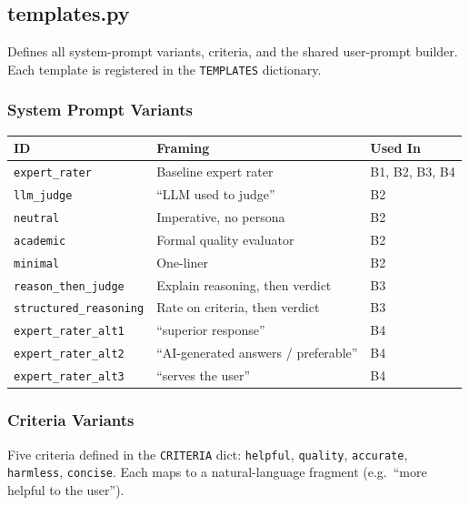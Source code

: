 \documentclass[11pt,a4paper]{article}
\begin{document}
\subsection{templates.py}

\begin{modulebox}
Defines all system-prompt variants, criteria, and the shared user-prompt
builder. Each template is registered in the \texttt{TEMPLATES} dictionary.
\end{modulebox}

\subsubsection*{System Prompt Variants}

\begin{center}
\small
\begin{tabular}{lll}
  \toprule
  \textbf{ID} & \textbf{Framing} & \textbf{Used In} \\
  \midrule
  \texttt{expert\_rater}  & Baseline expert rater   & B1, B2, B3, B4 \\
  \texttt{llm\_judge}     & ``LLM used to judge''   & B2 \\
  \texttt{neutral}        & Imperative, no persona  & B2 \\
  \texttt{academic}       & Formal quality evaluator & B2 \\
  \texttt{minimal}        & One-liner               & B2 \\
  \texttt{reason\_then\_judge} & Explain reasoning, then verdict & B3 \\
  \texttt{structured\_reasoning} & Rate on criteria, then verdict & B3 \\
  \texttt{expert\_rater\_alt1} & ``superior response'' & B4 \\
  \texttt{expert\_rater\_alt2} & ``AI-generated answers / preferable'' & B4 \\
  \texttt{expert\_rater\_alt3} & ``serves the user'' & B4 \\
  \bottomrule
\end{tabular}
\end{center}

\subsubsection*{Criteria Variants}

Five criteria defined in the \texttt{CRITERIA} dict: \texttt{helpful},
\texttt{quality}, \texttt{accurate}, \texttt{harmless}, \texttt{concise}.
Each maps to a natural-language fragment (e.g.\ ``more helpful to the user'').
\end{document}
